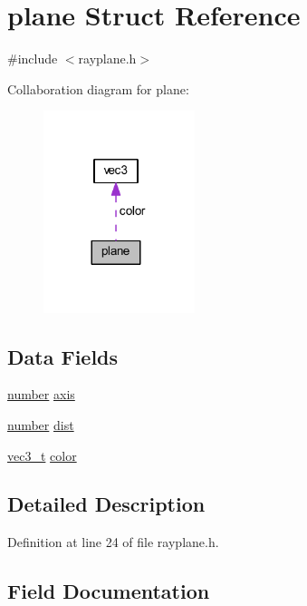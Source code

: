 \hypertarget{structplane}{}\section{plane Struct Reference}
\label{structplane}


{\ttfamily \#include $<$rayplane.\+h$>$}



Collaboration diagram for plane\+:\nopagebreak
\begin{figure}[H]
\begin{center}
\leavevmode
\includegraphics[width=125pt]{structplane__coll__graph}
\end{center}
\end{figure}
\subsection*{Data Fields}
\begin{DoxyCompactItemize}
\item 
\hyperlink{raymath_8h_aa97c1f529dc5a11a78758184c84a39c9}{number} \hyperlink{structplane_a0fef057ff8b9f6d358fcb427b1166edc}{axis}
\item 
\hyperlink{raymath_8h_aa97c1f529dc5a11a78758184c84a39c9}{number} \hyperlink{structplane_a07e9dd77b166f64838cd72a6213894ef}{dist}
\item 
\hyperlink{raymath_8h_afb3684d7701a8417d1a52fd94c84457c}{vec3\+\_\+t} \hyperlink{structplane_af1ec6dab64553dc67dc77bdc13deecb8}{color}
\end{DoxyCompactItemize}


\subsection{Detailed Description}


Definition at line 24 of file rayplane.\+h.



\subsection{Field Documentation}
